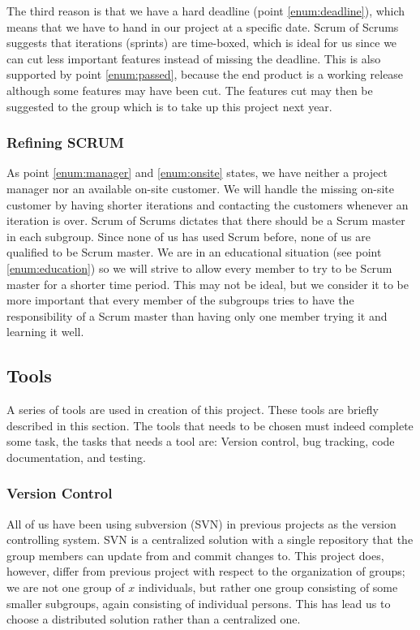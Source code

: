 The third reason is that we have a hard deadline (point \ref{enum:deadline}), which means that we have to hand in our project at a specific date.
Scrum of Scrums suggests that iterations (sprints) are time-boxed, which is ideal for us since we can cut less important features instead of missing the deadline.
This is also supported by point \ref{enum:passed}, because the end product is a working release although some features may have been cut.
The features cut may then be suggested to the group which is to take up this project next year.


\subsubsection{Refining SCRUM}
As point \ref{enum:manager} and \ref{enum:onsite} states, we have neither a project manager nor an available on-site customer.
We will handle the missing on-site customer by having shorter iterations and contacting the customers whenever an iteration is over.
Scrum of Scrums dictates that there should be a Scrum master in each subgroup.
Since none of us has used Scrum before, none of us are qualified to be Scrum master.
We are in an educational situation (see point \ref{enum:education}) so we will strive to allow every member to try to be Scrum master for a shorter time period.
This may not be ideal, but we consider it to be more important that every member of the subgroups tries to have the responsibility of a Scrum master than having only one member trying it and learning it well.

\begin{comment}
There is more:
*Scrum board
*The phases / meetings
**estimation
**sprint planning
*Scrum meetings
*Scrum of scrum def
*project manager progblem
\end{comment}


\subsection{Tools}
A series of tools are used in creation of this project.
These tools are briefly described in this section.
The tools that needs to be chosen must indeed complete some task, the tasks that needs a tool are: Version control, bug tracking, code documentation, and testing.

\subsubsection{Version Control}
All of us have been using subversion (SVN) in previous projects as the version controlling system.
SVN is a centralized solution \cite{subversion} with a single repository that the group members can update from and commit changes to.
This project does, however, differ from previous project with respect to the organization of groups; we are not one group of $x$ individuals, but rather one group consisting of some smaller subgroups, again consisting of individual persons.
This has lead us to choose a distributed solution rather than a centralized one.


